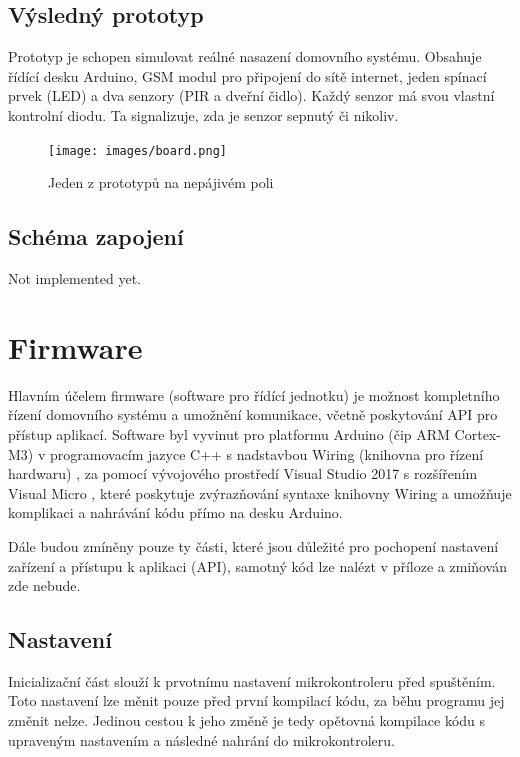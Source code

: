\documentclass[FM,DP]{tulthesis}  %
\begin{document}
\subsection{Výsledný prototyp}
Prototyp je schopen simulovat reálné nasazení domovního systému. Obsahuje řídící desku Arduino, GSM modul pro připojení do sítě internet, jeden spínací prvek (LED) a dva senzory (PIR a dveřní čidlo). Každý senzor má svou vlastní kontrolní diodu. Ta signalizuje, zda je senzor sepnutý či nikoliv.

\begin{figure}[H]
\begin{center}
\texttt{[image: images/board.png]}
\caption{Jeden z prototypů na nepájivém poli}
\label{image}
\end{center}
\end{figure}

\subsection{Schéma zapojení}
Not implemented yet.

\section{Firmware}
Hlavním účelem firmware (software pro řídící jednotku) je možnost kompletního řízení domovního systému a umožnění komunikace, včetně poskytování API pro přístup aplikací. Software byl vyvinut pro platformu Arduino (čip ARM Cortex-M3) v programovacím jazyce C++ s nadstavbou Wiring (knihovna pro řízení hardwaru) \cite{Wiring}, za pomocí vývojového prostředí Visual Studio 2017 s rozšířením Visual Micro \cite{Visual Micro}, které poskytuje zvýrazňování syntaxe knihovny Wiring a umožňuje komplikaci a nahrávání kódu přímo na desku Arduino.

Dále budou zmíněny pouze ty části, které jsou důležité pro pochopení nastavení zařízení a přístupu k aplikaci (API), samotný kód lze nalézt v příloze a zmiňován zde nebude.

\subsection{Nastavení}
Inicializační část slouží k prvotnímu nastavení mikrokontroleru před spuštěním. Toto nastavení lze měnit pouze před první kompilací kódu, za běhu programu jej změnit nelze. Jedinou cestou k jeho změně je tedy opětovná kompilace kódu s upraveným nastavením a následné nahrání do mikrokontroleru.
\end{document}
